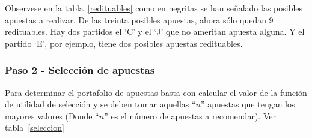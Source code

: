 \begin{table}[ht]
\centering
{}
\caption{Escogiendo apuestas que vale la pena realizar}
\label{redituables}
\end{table}

Observese en la tabla~\ref{redituables} como en negritas se han señalado las posibles apuestas a realizar. De las treinta posibles apuestas, ahora sólo quedan 9 redituables. Hay dos partidos el `C' y el `J' que no ameritan apuesta alguna. Y el partido `E', por ejemplo, tiene dos posibles apuestas redituables.

\subsubsection{Paso 2 - Selección de apuestas}

Para determinar el portafolio de apuestas basta con calcular el valor de la función de utilidad de selección y se deben tomar aquellas ``$n$'' apuestas que tengan los mayores valores (Donde ``$n$'' es el número de apuestas a recomendar).
Ver tabla~\ref{seleccion}

